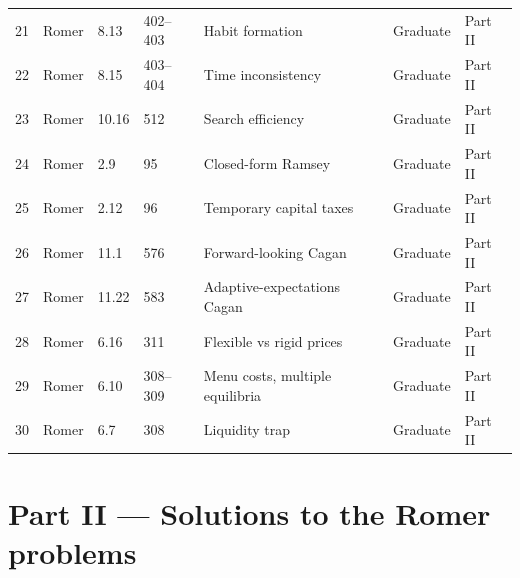 \documentclass[11pt,a4paper]{article}
\begin{document}
{\begin{longtable}{@{}rllllll@{}}
21 & Romer & 8.13 & 402--403 & Habit formation & Graduate & Part II \\
22 & Romer & 8.15 & 403--404 & Time inconsistency & Graduate & Part II \\
23 & Romer & 10.16 & 512 & Search efficiency & Graduate & Part II \\
24 & Romer & 2.9 & 95 & Closed-form Ramsey & Graduate & Part II \\
25 & Romer & 2.12 & 96 & Temporary capital taxes & Graduate & Part II \\
26 & Romer & 11.1 & 576 & Forward-looking Cagan & Graduate & Part II \\
27 & Romer & 11.22 & 583 & Adaptive-expectations Cagan & Graduate & Part II \\
28 & Romer & 6.16 & 311 & Flexible vs rigid prices & Graduate & Part II \\
29 & Romer & 6.10 & 308--309 & Menu costs, multiple equilibria & Graduate & Part II \\
30 & Romer & 6.7 & 308 & Liquidity trap & Graduate & Part II \\
\bottomrule
\end{longtable}}


\tableofcontents

\section*{Part II --- Solutions to the Romer problems}















\end{document}
